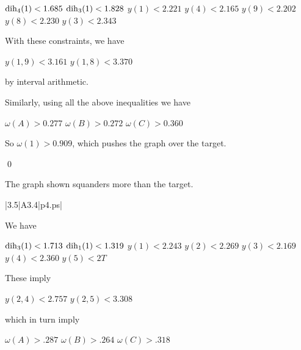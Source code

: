 $\operatorname{dih}_4(1) < 1.685$ \newline
$\operatorname{dih}_3(1) < 1.828$ \newline
$y(1)<2.221$ \newline
$y(4)<2.165$ \newline
$y(9)<2.202$ \newline
$y(8)<2.230$ \newline
$y(3)<2.343$ \newline


With these constraints, we have

$y(1,9) < 3.161$ \newline
$y(1,8) < 3.370$ \newline

by interval arithmetic.

Similarly, using all the above inequalities we have

$\omega(A) > 0.277$ \newline
$\omega(B) > 0.272$ \newline
$\omega(C)> 0.360$ \newline

So $\omega(1)>0.909$, which pushes the graph over the target.

\qed


\bigskip



 The graph shown 
squanders more than the target.  \endproclaim

\gram|3.5|A3.4|p4.ps|  %

We have 

$\operatorname{dih}_3(1) < 1.713$ \newline
$\operatorname{dih}_1(1) < 1.319$ \newline
$y(1)<2.243$ \newline
$y(2)<2.269$ \newline
$y(3)<2.169$ \newline
$y(4)<2.360$ \newline
$y(5)<2T$ \newline

These imply 

$y(2,4)<2.757$ \newline
$y(2,5)<3.308$ \newline

which in turn imply

$\omega(A)>.287$ \newline
$\omega(B)>.264$ \newline
$\omega(C)>.318$ \newline

